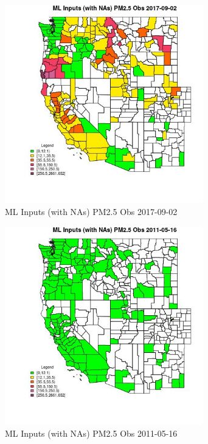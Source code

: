 \begin{figure} 
\centering  
\includegraphics[width=0.77\textwidth]{Code_Outputs/Report_ML_input_PM25_Step4_part_e_de_duplicated_aves_compiled_2019-05-21wNAs_CountyPM25_ObsMean2017-09-02.jpg} 
\caption{\label{fig:Report_ML_input_PM25_Step4_part_e_de_duplicated_aves_compiled_2019-05-21wNAsCountyPM25_ObsMean2017-09-02}ML Inputs (with NAs) PM2.5 Obs 2017-09-02} 
\end{figure} 
 

\begin{figure} 
\centering  
\includegraphics[width=0.77\textwidth]{Code_Outputs/Report_ML_input_PM25_Step4_part_e_de_duplicated_aves_compiled_2019-05-21wNAs_CountyPM25_ObsMean2011-05-16.jpg} 
\caption{\label{fig:Report_ML_input_PM25_Step4_part_e_de_duplicated_aves_compiled_2019-05-21wNAsCountyPM25_ObsMean2011-05-16}ML Inputs (with NAs) PM2.5 Obs 2011-05-16} 
\end{figure} 
 


